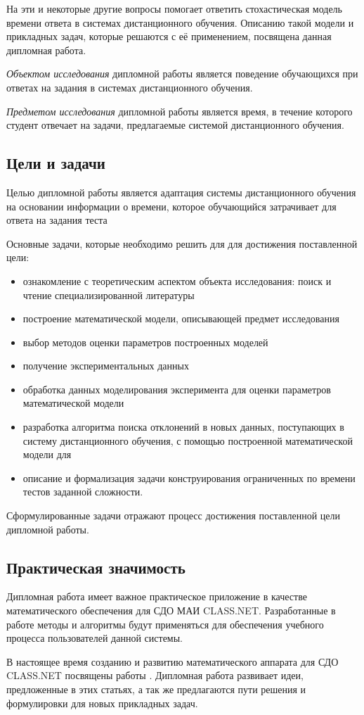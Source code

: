 На эти и некоторые другие вопросы помогает ответить стохастическая модель времени ответа в системах дистанционного обучения. Описанию такой модели и прикладных задач, которые решаются с её применением, посвящена данная дипломная работа.

{\itshape Объектом исследования} дипломной работы является поведение обуча\-ющихся при ответах на задания в системах дистанционного обучения. 

{\itshape Предметом исследования} дипломной работы является время, в течение которого студент отвечает на задачи, предлагаемые системой дистанционного обучения. 

\subsection{Цели и задачи}

Целью дипломной работы является адаптация системы дистанционного обучения на осно\-вании информации о времени, которое обучающийся затра\-чивает для ответа на задания теста

Основные задачи, которые необходимо решить для для достижения пос\-тавленной цели:
\begin{itemize}
\item ознакомление с теоретическим аспектом объекта исследования: поиск и чтение специализированной литературы
\item построение математической модели, описывающей предмет исследова\-ния
\item выбор методов оценки параметров построенных моделей
\item получение экспериментальных  данных
\item обработка данных моделирования эксперимента для оценки параметров математической модели
\item разработка алгоритма поиска отклонений в  новых данных, поступа\-ющих в систему дистанционного обучения, с помощью построенной мате\-матической модели для
\item описание и формализация задачи конструирования ограниченных по времени тестов заданной сложности.
\end{itemize}

Сформулированные задачи отражают процесс достижения поставленной цели дипломной работы.

\subsection{Практическая значимость}

Дипломная работа имеет важное практическое приложение в качестве математического обеспечения для СДО МАИ CLASS.NET. Разработанные в работе методы и алгоритмы будут применяться для обеспечения учебного процесса пользователей данной системы.

В настоящее время созданию и развитию математического аппарата для СДО CLASS.NET посвящены работы \cite{14.,15.,16.}. Дипломная работа развивает идеи, предложенные в этих статьях, а так же предлагаются пути решения и формулировки для новых прикладных задач. 
